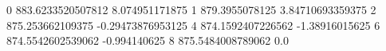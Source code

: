 0 883.6233520507812 8.074951171875
1 879.3955078125 3.84710693359375
2 875.253662109375 -0.29473876953125
4 874.1592407226562 -1.38916015625
6 874.5542602539062 -0.994140625
8 875.5484008789062 0.0
